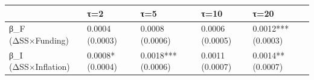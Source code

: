\begin{tabular}{lllll}
\toprule
 & τ=2 & τ=5 & τ=10 & τ=20 \\
\midrule
β_F (ΔSS×Funding) & 0.0004
(0.0003) & 0.0008
(0.0006) & 0.0006
(0.0005) & 0.0012***
(0.0003) \\
β_I (ΔSS×Inflation) & 0.0008*
(0.0004) & 0.0018***
(0.0006) & 0.0011
(0.0007) & 0.0014**
(0.0007) \\
\bottomrule
\end{tabular}
